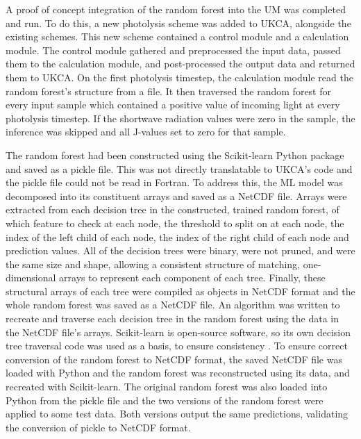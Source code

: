 \documentclass[journal abbreviation, manuscript]{copernicus}
\begin{document}
A proof of concept integration of the random forest into the UM was completed and run. To do this, a new photolysis scheme was added to UKCA, alongside the existing schemes. This new scheme contained a control module and a calculation module. The control module gathered and preprocessed the input data, passed them to the calculation module, and post-processed the output data and returned them to UKCA. On the first photolysis timestep, the calculation module read the random forest's structure from a file. It then traversed the random forest for every input sample which contained a positive value of incoming light at every photolysis timestep. If the shortwave radiation values were zero in the sample, the inference was skipped and all J-values set to zero for that sample.

The random forest had been constructed using the Scikit-learn Python package and saved as a pickle file. This was not directly translatable to UKCA's code and the pickle file could not be read in Fortran. To address this, the ML model was decomposed into its constituent arrays and saved as a NetCDF file. Arrays were extracted from each decision tree in the constructed, trained random forest, of which feature to check at each node, the threshold to split on at each node, the index of the left child of each node, the index of the right child of each node and prediction values. All of the decision trees were binary, were not pruned, and were the same size and shape, allowing a consistent structure of matching, one-dimensional arrays to represent each component of each tree. Finally, these structural arrays of each tree were compiled as objects in NetCDF format and the whole random forest was saved as a NetCDF file. 
An algorithm was written to recreate and traverse each decision tree in the random forest using the data in the NetCDF file's arrays. Scikit-learn is open-source software, so its own decision tree traversal code was used as a basis, to ensure consistency \citep{scikit-learn_scikit-learn-180sklearntree_treepyx_2025} \citep{scikit-learn_understanding_2025}. 
To ensure correct conversion of the random forest to NetCDF format, the saved NetCDF file was loaded with Python and the random forest was reconstructed using its data, and recreated with Scikit-learn. The original random forest was also loaded into Python from the pickle file and the two versions of the random forest were applied to some test data. Both versions output the same predictions, validating the conversion of pickle to NetCDF format.
\end{document}
